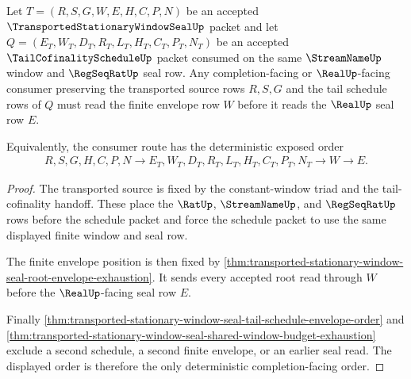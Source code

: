 \begin{theorem}
\label{thm:transported-stationary-window-seal-completion-schedule-envelope-determinacy}
Let $T=(R,S,G,W,E,H,C,P,N)$ be an accepted $\TransportedStationaryWindowSealUp$ packet and let $Q=(E_T,W_T,D_T,R_T,L_T,H_T,C_T,P_T,N_T)$ be an accepted $\TailCofinalityScheduleUp$ packet consumed on the same $\StreamNameUp$ window and $\RegSeqRatUp$ seal row. Any completion-facing or $\RealUp$-facing consumer preserving the transported source rows $R,S,G$ and the tail schedule rows of $Q$ must read the finite envelope row $W$ before it reads the $\RealUp$ seal row $E$.

Equivalently, the consumer route has the deterministic exposed order
$$
\begin{aligned}
  R,S,G,H,C,P,N
  \longrightarrow
  E_T,W_T,D_T,R_T,L_T,H_T,C_T,P_T,N_T
  \longrightarrow
  W
  \longrightarrow
  E .
\end{aligned}
$$
\end{theorem}
\begin{proof}
The transported source is fixed by the constant-window triad and the tail-cofinality handoff. These place the $\RatUp$, $\StreamNameUp$, and $\RegSeqRatUp$ rows before the schedule packet and force the schedule packet to use the same displayed finite window and seal row.

The finite envelope position is then fixed by \autoref{thm:transported-stationary-window-seal-root-envelope-exhaustion}. It sends every accepted root read through $W$ before the $\RealUp$-facing seal row $E$.

Finally \autoref{thm:transported-stationary-window-seal-tail-schedule-envelope-order} and \autoref{thm:transported-stationary-window-seal-shared-window-budget-exhaustion} exclude a second schedule, a second finite envelope, or an earlier seal read. The displayed order is therefore the only deterministic completion-facing order.
\end{proof}

